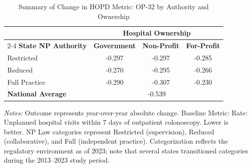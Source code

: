 \begin{table}[htbp]
    \centering
    \caption{Summary of Change in HOPD Metric: OP-32 by Authority and Ownership}
    \label{tab:d_hopd_op_32}
    \vspace{0.2cm}
    \begin{tabular}{lccc}
        \toprule
        & \multicolumn{3}{c}{\textbf{Hospital Ownership}} \\
        \cmidrule(lr){2-4}
        \textbf{State NP Authority} & \textbf{Government} & \textbf{Non-Profit} & \textbf{For-Profit} \\
        \midrule
        Restricted & -0.297 & -0.297 & -0.285 \\
        Reduced & -0.270 & -0.295 & -0.266 \\
        Full Practice & -0.290 & -0.307 & -0.230 \\
        \midrule
        \textbf{National Average} & \multicolumn{3}{c}{-0.539} \\
        \bottomrule
    \end{tabular}
    \vspace{0.1cm}
    \begin{minipage}{0.85\textwidth}
        \footnotesize \textit{Notes:} Outcome represents year-over-year absolute change. Baseline Metric: Rate: Unplanned hospital visits within 7 days of outpatient colonoscopy. Lower is better. NP Law categories represent Restricted (supervision), Reduced (collaborative), and Full (independent practice). Categorization reflects the regulatory environment as of 2023; note that several states transitioned categories during the 2013--2023 study period.
    \end{minipage}
\end{table}